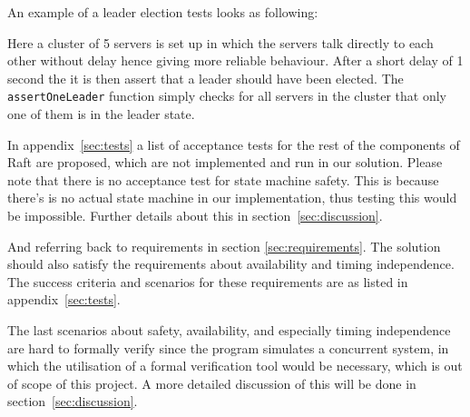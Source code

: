\pagebreak
An example of a leader election tests looks as following:

Here a cluster of 5 servers is set up in which the servers talk directly to each other without delay hence giving more reliable behaviour. After a short delay of 1 second the it is then assert that a leader should have been elected. The \texttt{assertOneLeader} function simply checks for all servers in the cluster that only one of them is in the leader state.

In appendix~\ref{sec:tests} a list of acceptance tests for the rest of the components of Raft are proposed, which are not implemented and run in our solution.
Please note that there is no acceptance test for state machine safety. This is because there's is no actual state machine in our implementation, thus testing this would be impossible. Further details about this in section~\ref{sec:discussion}.

And referring back to requirements in section \ref{sec:requirements}. The solution should also satisfy the requirements about availability and timing independence. The success criteria and scenarios for these requirements are as listed in appendix~\ref{sec:tests}.

The last scenarios about safety, availability, and especially timing independence are hard to formally verify since the program simulates a concurrent system, in which the utilisation of a formal verification tool would be necessary, which is out of scope of this project. A more detailed discussion of this will be done in section~\ref{sec:discussion}.

